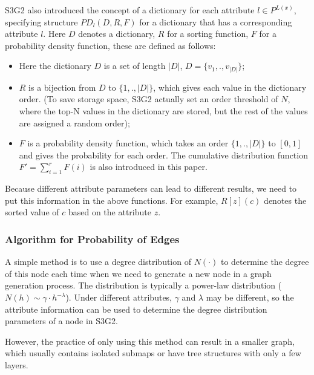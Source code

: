 \begin{survey}
\vspace{0.2cm}

S3G2 also introduced the concept of a dictionary for each attribute
\(l\in P^{L(x)}\), specifying structure \(PD_l(D, R, F)\) for a
dictionary that has a corresponding attribute \(l\). Here \(D\) denotes
a dictionary, \(R\) for a sorting function, \(F\) for a probability
density function, these are defined as follows:

\begin{itemize}
\item
  Here the dictionary \(D\) is a set of length \(|D|\),
  \(D=\{v_1,., v_{|D|}\}\);
\item
  \(R\) is a bijection from \(D\) to \(\{1,.,|D|\}\), which gives each
  value in the dictionary order. (To save storage space, S3G2 actually
  set an order threshold of \(N\), where the top-N values in the
  dictionary are stored, but the rest of the values are assigned a
  random order);
\item
  \(F\) is a probability density function, which takes an order
  \(\{1,.,|D|\}\) to \([0,1]\) and gives the probability for each order.
  The cumulative distribution function \(F'=\sum\limits_{i=1}^r F(i)\)
  is also introduced in this paper.
\end{itemize}

\vspace{0.2cm}

Because different attribute parameters can lead to different results, we
need to put this information in the above functions. For example,
\(R[z](c)\) denotes the sorted value of \(c\) based on the attribute
\(z\).

\subsubsection{Algorithm for Probability of Edges}

A simple method is to use a degree distribution of \(N(·)\) to determine
the degree of this node each time when we need to generate a new node in
a graph generation process. The distribution is typically a power-law
distribution (\(N(h)\sim \gamma \cdot h^{-\lambda}\)). Under different
attributes, \(\gamma\) and \(\lambda\) may be different, so the
attribute information can be used to determine the degree distribution
parameters of a node in S3G2.

However, the practice of only using this method can result in a smaller
graph, which usually contains isolated submaps or have tree structures
with only a few layers.


\end{survey}
